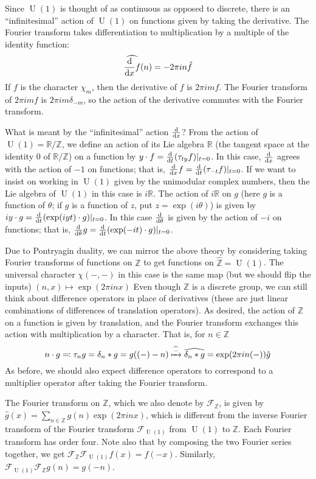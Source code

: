 \documentclass[11pt,leqno]{article}
\theoremstyle{plain}
\theoremstyle{definition}
\numberwithin{equation}{section}
\numberwithin{lem}{section}
\DeclareMathOperator{\U}{U}
\begin{document}
Since $\U(1)$ is thought of as continuous as opposed to discrete, there is an ``infinitesimal'' action of $\U(1)$ on functions given by taking the derivative. The Fourier transform takes differentiation to multiplication by a multiple of the identity function:
\[\widehat{\dv{x}f}(n) = -2\pi in\hat f\]
If $f$ is the character $\chi_m$, then the derivative of $f$ is $2\pi i m f$. The Fourier transform of $2\pi i m f$ is $2\pi i m \delta_{-m}$, so the action of the derivative commutes with the Fourier transform.

What is meant by the ``infinitesimal'' action $\dv{x}$? From the action of $\U(1) = \mathbb R/\mathbb Z$, we define an action of its Lie algebra $\mathbb R$ (the tangent space at the identity $0$ of $\mathbb R/\mathbb Z$) on a function by $y\cdot f = \dv{t}(\tau_{ty}f)|_{t=0}$. In this case, $\dv{x}$ agrees with the action of $-1$ on functions; that is, $\dv{x}f = \dv{t}(\tau_{-t}f)|_{t=0}$. If we want to insist on working in $\U(1)$ given by the unimodular complex numbers, then the Lie algebra of $\U(1)$ in this case is $i\mathbb R$. The action of $i\mathbb R$ on $g$ (here $g$ is a function of $\theta$; if $g$ is a function of $z$, put $z = \exp(i\theta)$) is given by $iy \cdot g = \dv{t}(\exp(iyt)\cdot g)|_{t=0}$. In this case $\dv{\theta}$ is given by the action of $-i$ on functions; that is, $\dv{\theta}g = \dv{t}(\exp(-it)\cdot g)|_{t=0}$.

Due to Pontryagin duality, we can mirror the above theory by considering taking Fourier transforms of functions on $\mathbb Z$ to get functions on $\widehat{\mathbb Z} = \U(1)$. The universal character $\chi(-,-)$ in this case is the same map (but we should flip the inputs) $(n,x)\mapsto \exp(2\pi inx)$ Even though $\mathbb Z$ is a discrete group, we can still think about difference operators in place of derivatives (these are just linear combinations of differences of translation operators). As desired, the action of $\mathbb Z$ on a function is given by translation, and the Fourier transform exchanges this action with multiplication by a character. That is, for $n\in\mathbb Z$
\[n\cdot g \eqqcolon \tau_ng = \delta_n\ast g = g((-)-n)\xmapsto{\widehat{-}}\widehat{\delta_n\ast g} = \exp(2\pi in(-)) \hat g\]
As before, we should also expect difference operators to correspond to a multiplier operator after taking the Fourier transform.

The Fourier transform on $\mathbb Z$, which we also denote by $\mathcal F_{\mathbb Z}$, is given by $\hat g(x) = \sum_{n\in \mathbb Z}g(n)\exp(2\pi i nx)$, which is different from the inverse Fourier transform of the Fourier transform $\mathcal F_{\U(1)}$ from $\U(1)$ to $\mathbb Z$. Each Fourier transform has order four. Note also that by composing the two Fourier series together, we get $\mathcal F_{\mathbb Z}\mathcal F_{\U(1)}f(x) = f(-x)$. Similarly, $\mathcal F_{\U(1)}\mathcal F_{\mathbb Z}g(n) = g(-n)$. 
\end{document}
